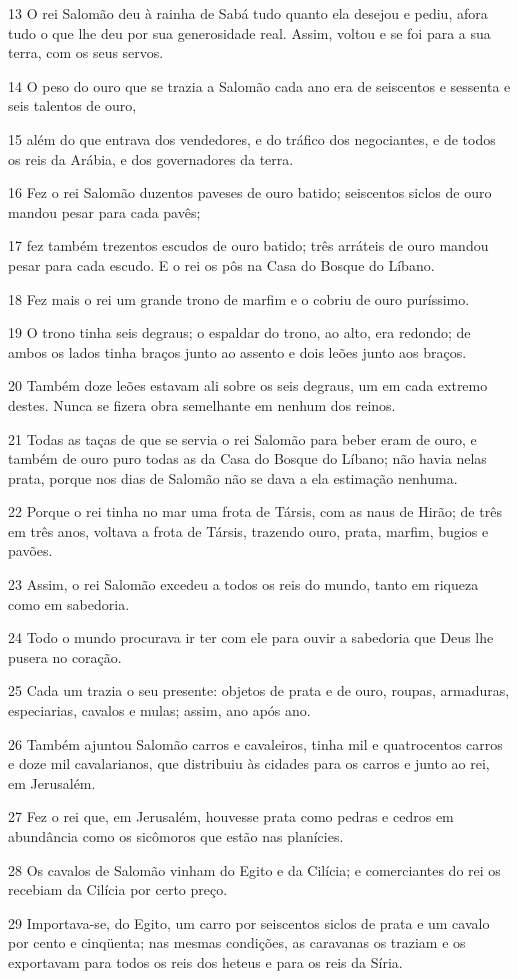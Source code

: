 \par 13 O rei Salomão deu à rainha de Sabá tudo quanto ela desejou e pediu, afora tudo o que lhe deu por sua generosidade real. Assim, voltou e se foi para a sua terra, com os seus servos.
\par 14 O peso do ouro que se trazia a Salomão cada ano era de seiscentos e sessenta e seis talentos de ouro,
\par 15 além do que entrava dos vendedores, e do tráfico dos negociantes, e de todos os reis da Arábia, e dos governadores da terra.
\par 16 Fez o rei Salomão duzentos paveses de ouro batido; seiscentos siclos de ouro mandou pesar para cada pavês;
\par 17 fez também trezentos escudos de ouro batido; três arráteis de ouro mandou pesar para cada escudo. E o rei os pôs na Casa do Bosque do Líbano.
\par 18 Fez mais o rei um grande trono de marfim e o cobriu de ouro puríssimo.
\par 19 O trono tinha seis degraus; o espaldar do trono, ao alto, era redondo; de ambos os lados tinha braços junto ao assento e dois leões junto aos braços.
\par 20 Também doze leões estavam ali sobre os seis degraus, um em cada extremo destes. Nunca se fizera obra semelhante em nenhum dos reinos.
\par 21 Todas as taças de que se servia o rei Salomão para beber eram de ouro, e também de ouro puro todas as da Casa do Bosque do Líbano; não havia nelas prata, porque nos dias de Salomão não se dava a ela estimação nenhuma.
\par 22 Porque o rei tinha no mar uma frota de Társis, com as naus de Hirão; de três em três anos, voltava a frota de Társis, trazendo ouro, prata, marfim, bugios e pavões.
\par 23 Assim, o rei Salomão excedeu a todos os reis do mundo, tanto em riqueza como em sabedoria.
\par 24 Todo o mundo procurava ir ter com ele para ouvir a sabedoria que Deus lhe pusera no coração.
\par 25 Cada um trazia o seu presente: objetos de prata e de ouro, roupas, armaduras, especiarias, cavalos e mulas; assim, ano após ano.
\par 26 Também ajuntou Salomão carros e cavaleiros, tinha mil e quatrocentos carros e doze mil cavalarianos, que distribuiu às cidades para os carros e junto ao rei, em Jerusalém.
\par 27 Fez o rei que, em Jerusalém, houvesse prata como pedras e cedros em abundância como os sicômoros que estão nas planícies.
\par 28 Os cavalos de Salomão vinham do Egito e da Cilícia; e comerciantes do rei os recebiam da Cilícia por certo preço.
\par 29 Importava-se, do Egito, um carro por seiscentos siclos de prata e um cavalo por cento e cinqüenta; nas mesmas condições, as caravanas os traziam e os exportavam para todos os reis dos heteus e para os reis da Síria.

